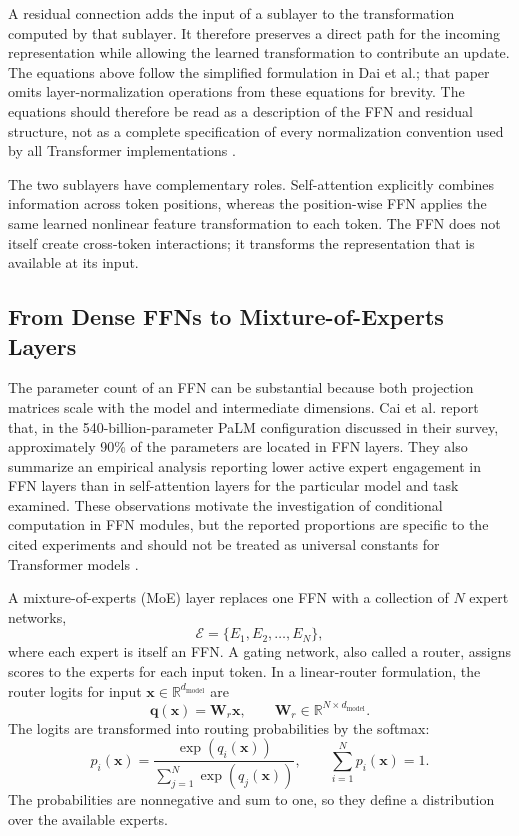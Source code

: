 A residual connection adds the input of a sublayer to the transformation
computed by that sublayer. It therefore preserves a direct path for the
incoming representation while allowing the learned transformation to
contribute an update. The equations above follow the simplified
formulation in Dai et al.; that paper omits layer-normalization operations
from these equations for brevity. The equations should therefore be read
as a description of the FFN and residual structure, not as a complete
specification of every normalization convention used by all Transformer
implementations \parencite{dai2024deepseekmoe}.

The two sublayers have complementary roles. Self-attention explicitly
combines information across token positions, whereas the position-wise
FFN applies the same learned nonlinear feature transformation to each
token. The FFN does not itself create cross-token interactions; it
transforms the representation that is available at its input.

\subsection{From Dense FFNs to Mixture-of-Experts Layers}
\label{subsec:ffn-to-moe}

The parameter count of an FFN can be substantial because both projection
matrices scale with the model and intermediate dimensions. Cai et al.
report that, in the 540-billion-parameter PaLM configuration discussed
in their survey, approximately 90\% of the parameters are located in
FFN layers. They also summarize an empirical analysis reporting lower
active expert engagement in FFN layers than in self-attention layers
for the particular model and task examined. These observations motivate
the investigation of conditional computation in FFN modules, but the
reported proportions are specific to the cited experiments and should
not be treated as universal constants for Transformer models
\parencite{cai2025survey}.

A mixture-of-experts (MoE) layer replaces one FFN with a collection of
\(N\) expert networks,
\[
    \mathcal{E}
    =
    \{E_1,E_2,\ldots,E_N\},
\]
where each expert is itself an FFN. A gating network, also called a
router, assigns scores to the experts for each input token. In a
linear-router formulation, the router logits for input
\(\mathbf{x}\in\mathbb{R}^{d_{\mathrm{model}}}\) are
\begin{equation}
    \mathbf{q}(\mathbf{x})
    =
    \mathbf{W}_{r}\mathbf{x},
    \qquad
    \mathbf{W}_{r}
    \in\mathbb{R}^{N\times d_{\mathrm{model}}}.
    \label{eq:moe-router-logits}
\end{equation}
The logits are transformed into routing probabilities by the softmax:
\begin{equation}
    p_i(\mathbf{x})
    =
    \frac{\exp(q_i(\mathbf{x}))}
    {\displaystyle\sum_{j=1}^{N}\exp(q_j(\mathbf{x}))},
    \qquad
    \sum_{i=1}^{N}p_i(\mathbf{x})=1.
    \label{eq:moe-router-softmax}
\end{equation}
The probabilities are nonnegative and sum to one, so they define a
distribution over the available experts.

